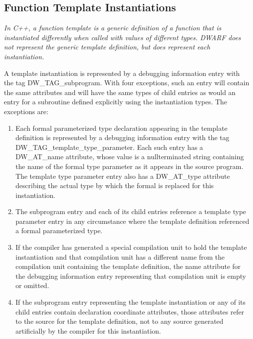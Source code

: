 \subsection{Function Template Instantiations}
\label{chap:functiontemplateinstantiations}

\textit{In C++, a function template is a generic definition of
a function that is instantiated differently when called with
values of different types. DWARF does not represent the generic
template definition, but does represent each instantiation.}

A template instantiation is represented by a debugging
information entry with the tag DW\_TAG\_subprogram. With four
exceptions, such an entry will contain the same attributes and
will have the same types of child entries as would an entry
for a subroutine defined explicitly using the instantiation
types. The exceptions are:

\begin{enumerate}[1.]
\item Each formal parameterized type declaration appearing in the
template definition is represented by a debugging information
entry with the tag DW\-\_TAG\-\_template\-\_type\-\_parameter. Each
such entry has a DW\-\_AT\-\_name attribute, whose value is a
null\dash terminated string containing the name of the formal
type parameter as it appears in the source program. The
template type parameter entry also has a DW\_AT\_type attribute
describing the actual type by which the formal is replaced
for this instantiation.

\item The subprogram entry and each of its child entries reference
a template type parameter entry in any circumstance where
the template definition referenced a formal parameterized type.

\item If the compiler has generated a special compilation unit
to hold the template instantiation and that compilation unit
has a different name from the compilation unit containing
the template definition, the name attribute for the debugging
information entry representing that compilation unit is empty
or omitted.

\item If the subprogram entry representing the template
instantiation or any of its child entries contain declaration
coordinate attributes, those attributes refer to the source
for the template definition, not to any source generated
artificially by the compiler for this instantiation.
\end{enumerate}



